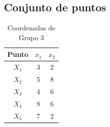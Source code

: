 \documentclass[12pt,a4paper]{article}
\begin{document}
\subsection{Conjunto de puntos}
\begin{table}[H]\centering
  \caption{Coordenadas de Grupo 3}
  \begin{tabular}{ccc}\toprule
    \textbf{Punto} & \textbf{$x_1$} & \textbf{$x_2$}\\\midrule
    $X_{1}$ & 3 & 2 \\
    $X_{2}$ & 5 & 8 \\
    $X_{3}$ & 4 & 6 \\
    $X_{4}$ & 8 & 6 \\
    $X_{5}$ & 7 & 2 \\
  \bottomrule\end{tabular}
\end{table}
\end{document}
